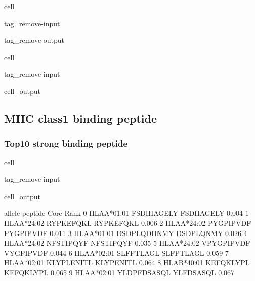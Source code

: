 \documentclass[letterpaper,10pt,english]{jupyterBook}
\begin{document}
\begin{sphinxuseclass}{cell}
\begin{sphinxuseclass}{tag_remove-input}
\begin{sphinxuseclass}{tag_remove-output}
\end{sphinxuseclass}
\end{sphinxuseclass}
\end{sphinxuseclass}
\begin{sphinxuseclass}{cell}
\begin{sphinxuseclass}{tag_remove-input}\begin{sphinxVerbatimOutput}

\begin{sphinxuseclass}{cell_output}
\noindent{}

\end{sphinxuseclass}\end{sphinxVerbatimOutput}

\end{sphinxuseclass}
\end{sphinxuseclass}

\subsection{MHC class1 binding peptide}
\label{\detokenize{ipynb/chapter4:mhc-class1-binding-peptide}}

\subsubsection{Top10 strong binding peptide}
\label{\detokenize{ipynb/chapter4:top10-strong-binding-peptide}}
\begin{sphinxuseclass}{cell}
\begin{sphinxuseclass}{tag_remove-input}\begin{sphinxVerbatimOutput}

\begin{sphinxuseclass}{cell_output}
\begin{sphinxVerbatim}[commandchars=\\\{\}]
        allele      peptide       Core   Rank
0  HLA\PYGZhy{}A*01:01   FSDIHAGELY  FSDHAGELY  0.004
1  HLA\PYGZhy{}A*24:02    RYPKEFQKL  RYPKEFQKL  0.006
2  HLA\PYGZhy{}A*24:02    PYGPIPVDF  PYGPIPVDF  0.011
3  HLA\PYGZhy{}A*01:01  DSDPLQDHNMY  DSDPLQNMY  0.026
4  HLA\PYGZhy{}A*24:02    NFSTIPQYF  NFSTIPQYF  0.035
5  HLA\PYGZhy{}A*24:02   VPYGPIPVDF  VYGPIPVDF  0.044
6  HLA\PYGZhy{}A*02:01    SLFPTLAGL  SLFPTLAGL  0.059
7  HLA\PYGZhy{}A*02:01   KLYPLENITL  KLYPENITL  0.064
8  HLA\PYGZhy{}B*40:01    KEFQKLYPL  KEFQKLYPL  0.065
9  HLA\PYGZhy{}A*02:01  YLDPFDSASQL  YLFDSASQL  0.067
\end{sphinxVerbatim}

\end{sphinxuseclass}\end{sphinxVerbatimOutput}

\end{sphinxuseclass}
\end{sphinxuseclass}
\end{document}
